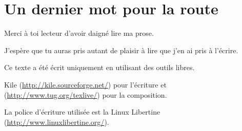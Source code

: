 \chapter[Un dernier mot pour la route]{Un dernier mot pour la route}
Merci à toi lecteur d'avoir daigné lire ma prose.

J'espère que tu auras pris autant de plaisir à lire que j'en ai pris à l'écrire.



Ce texte a été écrit uniquement en utilisant des outils libres.

Kile (\url{http://kile.sourceforge.net/}) pour l'écriture et \LaTeXe{} (\url{http://www.tug.org/texlive/}) 
pour la composition.

La police d'écriture utilisée est la Linux Libertine (\url{http://www.linuxlibertine.org/}).
